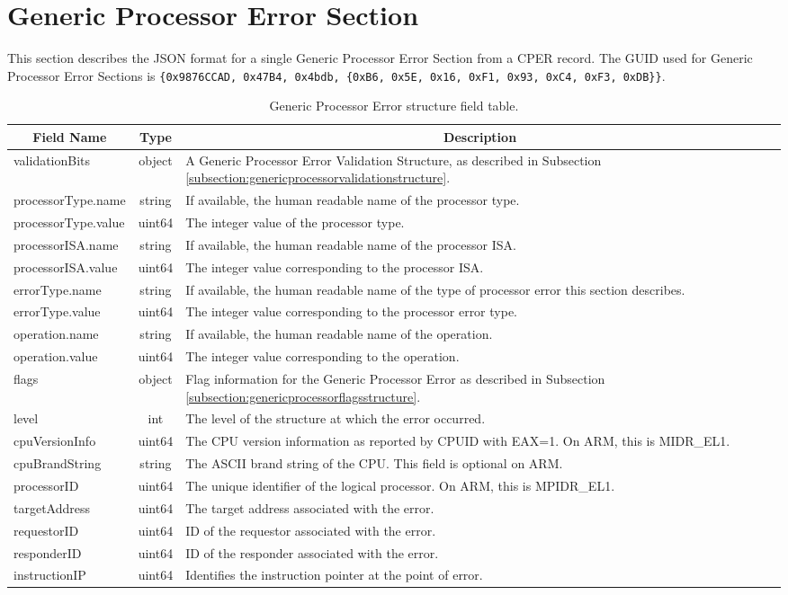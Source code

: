 \documentclass{report}
\newcommand*{\thead}[1]{\multicolumn{1}{|c|}{\bfseries #1}}
\newcommand*{\jsontable}[1]{
    \begin{table}[!ht]
    \label{#1}
    \centering
    \begin{adjustbox}{center}
    \begin{tabular}{|l|c|p{8cm}|}
    \hline
    \thead{Field Name} & \thead{Type} & \thead{Description} \\
    \hline
}
\newcommand*{\jsontableend}[1]{
    \hline
    \end{tabular}
    \end{adjustbox}
    \caption{#1}
    \label{table:#1}
    \end{table}
    \FloatBarrier
}
\begin{document}
\section{Generic Processor Error Section}
\label{section:genericprocessorerrorsection}
This section describes the JSON format for a single Generic Processor Error Section from a CPER record. The GUID used for Generic Processor Error Sections is \texttt{\{0x9876CCAD, 0x47B4, 0x4bdb, \{0xB6, 0x5E, 0x16, 0xF1, 0x93, 0xC4, 0xF3, 0xDB\}\}}.
\jsontable{table:genericprocessorerrorsection}
validationBits & object & A Generic Processor Error Validation Structure, as described in Subsection \ref{subsection:genericprocessorvalidationstructure}.\\
\hline
processorType.name & string & If available, the human readable name of the processor type.\\
processorType.value & uint64 & The integer value of the processor type.\\
\hline
processorISA.name & string & If available, the human readable name of the processor ISA.\\
processorISA.value & uint64 & The integer value corresponding to the processor ISA.\\
\hline
errorType.name & string & If available, the human readable name of the type of processor error this section describes.\\
errorType.value & uint64 & The integer value corresponding to the processor error type.\\
\hline
operation.name & string & If available, the human readable name of the operation.\\
operation.value & uint64 & The integer value corresponding to the operation.\\
\hline
flags & object & Flag information for the Generic Processor Error as described in Subsection \ref{subsection:genericprocessorflagsstructure}.\\
\hline
level & int & The level of the structure at which the error occurred.\\
\hline
cpuVersionInfo & uint64 & The CPU version information as reported by CPUID with EAX=1. On ARM, this is MIDR\_EL1.\\
\hline
cpuBrandString & string & The ASCII brand string of the CPU. This field is optional on ARM.\\
\hline
processorID & uint64 & The unique identifier of the logical processor. On ARM, this is MPIDR\_EL1.\\
\hline
targetAddress & uint64 & The target address associated with the error.\\
\hline
requestorID & uint64 & ID of the requestor associated with the error.\\
\hline
responderID & uint64 & ID of the responder associated with the error.\\
\hline
instructionIP & uint64 & Identifies the instruction pointer at the point of error.\\
\jsontableend{Generic Processor Error structure field table.}
\end{document}
